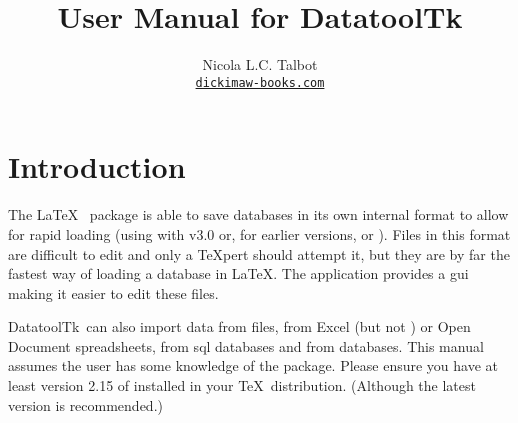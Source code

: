 
\usepackage{fontspec}
\setmainfont{Linux Libertine O}
\usepackage{verbatim}
\usepackage
 [
    novref,
 ]{texjavahelp}

\hypersetup{colorlinks,linkcolor=blue}


\newcommand{\actionoptval}[2]{\actionopt{#1}\dequals #2}
\newcommand{\actionoptvalm}[2]{\actionopt{#1}\dequals \marg{#2}}

\newcommand{\appname}{DatatoolTk}

\title{User Manual for \appname}
\author{Nicola L.C. Talbot\\\href{https://www.dickimaw-books.com/}{\nolinkurl{dickimaw-books.com}}}


\GlsXtrLoadResources[src={datatooltk},
 \TeXJavaHelpSymbolResourceOptions
]

\GlsXtrLoadResources[src={datatooltk,\langbibsrcs},
 \TeXJavaHelpGlsResourceOptions
]


\maketitle
\frontmatter
\tableofcontents
\listoffigures

\mainmatter
\chapter{Introduction}
\label{sec:introduction}

The \LaTeX\  package is able to save databases in its
own internal format to allow for rapid loading (using
 with
 v3.0 or, for earlier versions,
 or
).  Files in this
 format are difficult to edit and only a \TeX pert should
attempt it, but they are by far the fastest way of loading a
 \gls{database} in \LaTeX. The 
application provides a \gls{gui} making it easier to edit these
files. 

\appname\ can also import data from  files, from
Excel  (but not )
or Open Document  spreadsheets, from 
\gls{sql} databases and from  databases.
This manual assumes the user has some knowledge of the
 package. Please ensure you have at least version
2.15 of  installed in your \TeX\ distribution.
(Although the latest version is recommended.)

